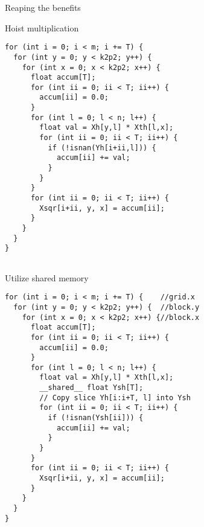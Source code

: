 \begin{frame}[fragile]{Reaping the benefits}
\begin{minipage}{.55\textwidth}
  \centering
\begin{center}
  Hoist multiplication
\end{center}
\begin{verbatim}
for (int i = 0; i < m; i += T) {
  for (int y = 0; y < k2p2; y++) {
    for (int x = 0; x < k2p2; x++) {
      float accum[T];
      for (int ii = 0; ii < T; ii++) {
        accum[ii] = 0.0;
      }
      for (int l = 0; l < n; l++) {
        float val = Xh[y,l] * Xth[l,x];
        for (int ii = 0; ii < T; ii++) {
          if (!isnan(Yh[i+ii,l])) {
            accum[ii] += val;
          }
        }
      }
      for (int ii = 0; ii < T; ii++) {
        Xsqr[i+ii, y, x] = accum[ii];
      }
    }
  }
}


\end{verbatim}
\end{minipage}%
\begin{minipage}{.5\textwidth}
  \centering
\begin{center}
  Utilize shared memory
\end{center}
\begin{verbatim}
for (int i = 0; i < m; i += T) {    //grid.x
  for (int y = 0; y < k2p2; y++) {  //block.y
    for (int x = 0; x < k2p2; x++) {//block.x
      float accum[T];
      for (int ii = 0; ii < T; ii++) {
        accum[ii] = 0.0;
      }
      for (int l = 0; l < n; l++) {
        float val = Xh[y,l] * Xth[l,x];
        __shared__ float Ysh[T];
        // Copy slice Yh[i:i+T, l] into Ysh
        for (int ii = 0; ii < T; ii++) {
          if (!isnan(Ysh[ii])) {
            accum[ii] += val;
          }
        }
      }
      for (int ii = 0; ii < T; ii++) {
        Xsqr[i+ii, y, x] = accum[ii];
      }
    }
  }
}
\end{verbatim}
\end{minipage}
\end{frame}

